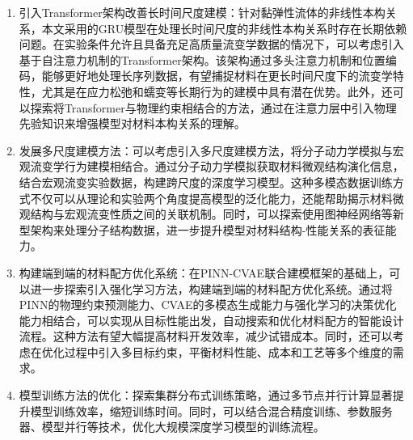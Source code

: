 \begin{enumerate}[topsep = 0 pt, itemsep= 0 pt, parsep=0pt, partopsep=0pt, leftmargin=0pt, itemindent=44pt, labelsep=6pt, label=(\arabic*)]
  \item 引入Transformer架构改善长时间尺度建模：针对黏弹性流体的非线性本构关系，本文采用的GRU模型在处理长时间尺度的非线性本构关系时存在长期依赖问题。在实验条件允许且具备充足高质量流变学数据的情况下，可以考虑引入基于自注意力机制的Transformer架构。该架构通过多头注意力机制和位置编码，能够更好地处理长序列数据，有望捕捉材料在更长时间尺度下的流变学特性，尤其是在应力松弛和蠕变等长期行为的建模中具有潜在优势。此外，还可以探索将Transformer与物理约束相结合的方法，通过在注意力层中引入物理先验知识来增强模型对材料本构关系的理解。

  \item 发展多尺度建模方法：可以考虑引入多尺度建模方法，将分子动力学模拟与宏观流变学行为建模相结合。通过分子动力学模拟获取材料微观结构演化信息，结合宏观流变实验数据，构建跨尺度的深度学习模型。这种多模态数据训练方式不仅可以从理论和实验两个角度提高模型的泛化能力，还能帮助揭示材料微观结构与宏观流变性质之间的关联机制。同时，可以探索使用图神经网络等新型架构来处理分子结构数据，进一步提升模型对材料结构-性能关系的表征能力。

  \item 构建端到端的材料配方优化系统：在PINN-CVAE联合建模框架的基础上，可以进一步探索引入强化学习方法，构建端到端的材料配方优化系统。通过将PINN的物理约束预测能力、CVAE的多模态生成能力与强化学习的决策优化能力相结合，可以实现从目标性能出发，自动搜索和优化材料配方的智能设计流程。这种方法有望大幅提高材料开发效率，减少试错成本。同时，还可以考虑在优化过程中引入多目标约束，平衡材料性能、成本和工艺等多个维度的需求。
  \item 模型训练方法的优化：探索集群分布式训练策略，通过多节点并行计算显著提升模型训练效率，缩短训练时间。同时，可以结合混合精度训练、参数服务器、模型并行等技术，优化大规模深度学习模型的训练流程。
\end{enumerate}
